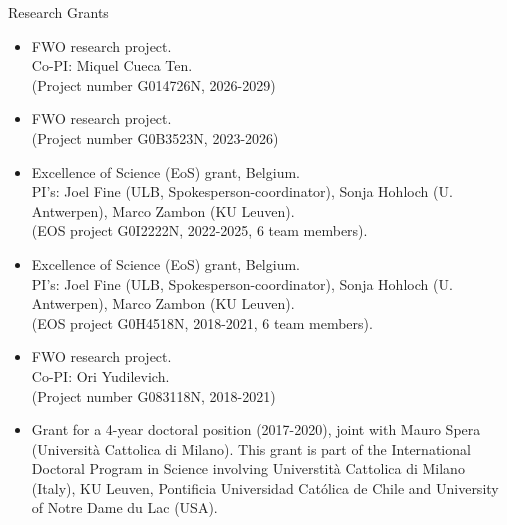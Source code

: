 \documentclass[12p]{resume}
\begin{document}
\begin{category}{Research Grants}
 
  \citemnobullet 
\begin{itemize}
   \item   FWO research project.\\
     Co-PI: Miquel Cueca Ten.\\
(Project number G014726N, 2026-2029)


   \item   FWO research project.\\
(Project number G0B3523N, 2023-2026)

\item Excellence of Science (EoS) grant, Belgium. \\
PI's: Joel Fine (ULB, Spokesperson-coordinator), 	Sonja Hohloch (U. Antwerpen), Marco Zambon (KU Leuven).\\
(EOS project G0I2222N, 2022-2025, 6 team members). 
 
 
\item Excellence of Science (EoS) grant, Belgium. \\
PI's: Joel Fine (ULB, Spokesperson-coordinator), 	Sonja Hohloch (U. Antwerpen), Marco Zambon (KU Leuven).\\
(EOS project G0H4518N, 2018-2021, 6 team members). 
 

 

 \item   FWO research project.\\
  Co-PI: Ori Yudilevich.\\
(Project number G083118N, 2018-2021)


\item Grant for a 4-year doctoral position (2017-2020), 
joint with Mauro Spera (Universit\`a Cattolica di Milano).
 This grant is part of the International Doctoral Program in Science involving Universtit\`a Cattolica di Milano (Italy), KU Leuven,    Pontificia Universidad Cat\'olica de Chile and University of Notre Dame du Lac (USA). 


\end{itemize}
\end{category}
\end{document}
